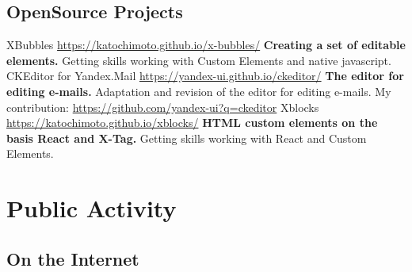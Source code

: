 \documentclass[11pt,a4paper]{moderncv}
\begin{document}
  \subsection{OpenSource Projects}
  \cvline
    {XBubbles}
    {\url{https://katochimoto.github.io/x-bubbles/}\newline{}
    \textbf{Creating a set of editable elements.}\newline{}
    Getting skills working with Custom Elements and native javascript.}
  \cvline
    {CKEditor for Yandex.Mail}
    {\url{https://yandex-ui.github.io/ckeditor/}\newline{}
    \textbf{The editor for editing e-mails.}\newline{}
    Adaptation and revision of the editor for editing e-mails.\newline{}
    My contribution:\newline{}
    \url{https://github.com/yandex-ui?q=ckeditor}
    }
  \cvline
    {Xblocks}
    {\url{https://katochimoto.github.io/xblocks/}\newline{}
    \textbf{HTML custom elements on the basis React and X-Tag.}\newline{}
    Getting skills working with React and Custom Elements.}

\section{Public Activity}
  \subsection{On the Internet}
\end{document}
